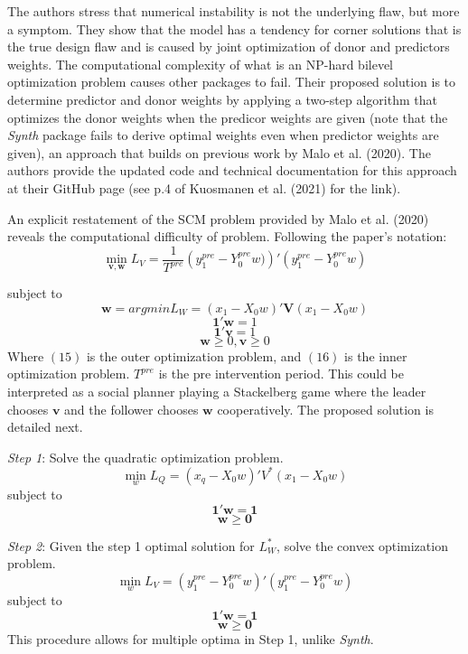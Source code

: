 \documentclass[12pt,a4paper,draft]{article}
\begin{document}
The authors stress that numerical instability is not the underlying flaw, but more 
a symptom. They show that the model has a tendency for corner solutions that 
is the true design flaw and is caused by joint optimization of donor and 
predictors weights. The computational complexity of what is an NP-hard 
bilevel optimization problem causes other packages to fail. 
Their proposed solution is to determine predictor and donor 
weights by applying a two-step algorithm that optimizes the donor 
weights when the predicor weights are given (note that the \emph{Synth} package 
fails to derive optimal weights even when predictor weights are given), 
an approach that builds on previous work by Malo et al. (2020). The
authors provide the updated code and technical documentation for this approach 
at their GitHub page (see p.4 of Kuosmanen et al. (2021) for the link).

An explicit restatement of the SCM problem provided by Malo et al. (2020) 
reveals the computational difficulty of problem. Following the paper's 
notation:
\begin{equation}
    \min_{\mathbf{v,w}} L_V = 
    \frac{1}{T^{pre}} \left(y_1^{pre}-Y_0^{pre}w)\right) ' 
    \left( y_1^{pre}-Y_0^{pre}w \right)
\end{equation}

subject to
\begin{equation}
    \mathbf{w}= argmin L_W = \left( x_1-X_0 w \right) ' \mathbf{V}
    \left( x_1 - X_0 w\right)
\end{equation}
$$\mathbf{1'w}=1$$
$$\mathbf{1'v}=1$$
$$\mathbf{w}\ge 0, \mathbf{v} \ge 0$$
Where $(15)$ is the outer optimization problem, and $(16)$ is the inner 
optimization problem. $T^{pre}$ is the pre intervention period. This could be 
interpreted as a social planner playing a Stackelberg game where the 
leader chooses $\mathbf{v}$ and the follower chooses $\mathbf{w}$ cooperatively.
\newline
The proposed solution is detailed next.

\emph{Step 1}: Solve the quadratic optimization problem.
$$
    \min_w  L_Q = (x_q-X_0 w)' V^* (x_1 - X_0 w)
$$
subject to 
$$ \mathbf{1'w=1} $$
$$ \mathbf{w \ge 0} $$

\emph{Step 2}: Given the step 1 optimal solution for $L_W^*$, solve the 
convex optimization problem.
$$ \min_w  L_V = (y_1^{pre}-Y_0^{pre}w)'(y_1^{pre}-Y_0^{pre}w)$$
subject to
$$ \mathbf{1'w=1} $$
$$ \mathbf{w \ge 0} $$
This procedure allows for multiple optima in Step 1, unlike \emph{Synth}.
\end{document}
